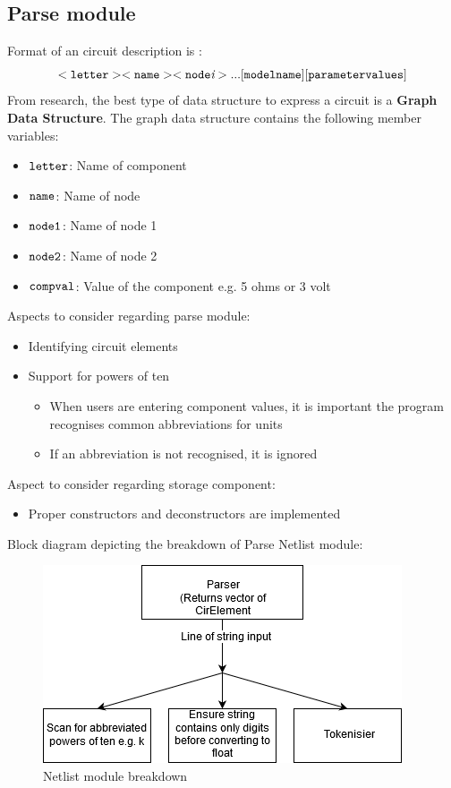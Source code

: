 \documentclass[12pt,a4paper]{article}
\begin{document}
\subsection{Parse module}

Format of an circuit description is \cite{spice}:
		$$\tt{<letter><name><node\textit{i}> ... [modelname][parametervalues]}$$
From research, the best type of data structure to express a circuit is a \textbf{Graph Data Structure}.
The graph data structure contains the following member variables:
\begin{itemize}
	\item $\tt{letter}$: Name of component 
	\item $\tt{name}$: Name of node 
	\item $\tt{node1}$: Name of node 1
	\item $\tt{node2}$: Name of node 2
	\item $\tt{compval}$: Value of the component e.g. 5 ohms or 3 volt
\end{itemize}

\par
Aspects to consider regarding parse module:
\begin{itemize}
	\item Identifying circuit elements
	\item Support for powers of ten
	\begin{itemize}
		\item When users are entering component values, it is important the program recognises common abbreviations for units
		\item If an abbreviation is not recognised, it is ignored
	\end{itemize} 
\end{itemize}
Aspect to consider regarding storage component:
\begin{itemize}
	\item Proper constructors and deconstructors are implemented
\end{itemize}
Block diagram depicting the breakdown of Parse Netlist module:
\begin{figure}[h]
    \centering
    \includegraphics[scale=0.75]{Netlist breakdown}
    \caption{Netlist module breakdown}
    \label{fig:Netlist breakdown}
\end{figure}
\end{document}
